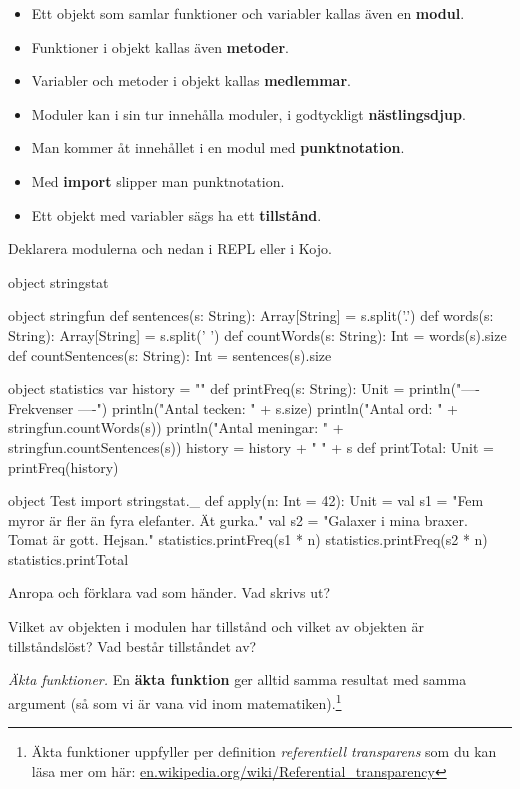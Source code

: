 \begin{itemize}[noitemsep, nolistsep]
\item Ett objekt som samlar funktioner och variabler kallas även en \textbf{modul}.
\item Funktioner i objekt kallas även \textbf{metoder}.
\item Variabler och metoder i objekt kallas \textbf{medlemmar}.
\item Moduler kan i sin tur innehålla moduler, i godtyckligt \textbf{nästlingsdjup}.
\item Man kommer åt innehållet i en modul med \textbf{punktnotation}.
\item Med \textbf{import} slipper man punktnotation.
\item Ett objekt med variabler sägs ha ett \textbf{tillstånd}.
\end{itemize}

\Subtask Deklarera modulerna  och  nedan i REPL eller i Kojo.

\begin{Code}
object stringstat {
  object stringfun {
    def sentences(s: String): Array[String] = s.split('.')
    def words(s: String): Array[String] = s.split(' ')
    def countWords(s: String): Int = words(s).size
    def countSentences(s: String): Int = sentences(s).size
  }

  object statistics {
    var history = ""
    def printFreq(s: String): Unit = {
      println("\n---- Frekvenser ----")
      println("Antal tecken:   " + s.size)
      println("Antal ord:      " + stringfun.countWords(s))
      println("Antal meningar: " + stringfun.countSentences(s))
      history = history + " " + s
    }
    def printTotal: Unit = printFreq(history)
  }
}

object Test {
  import stringstat._
  def apply(n: Int = 42): Unit = {
    val s1 = "Fem myror är fler än fyra elefanter. Ät gurka."
    val s2 = "Galaxer i mina braxer. Tomat är gott. Hejsan."
    statistics.printFreq(s1 * n)
    statistics.printFreq(s2 * n)
    statistics.printTotal
  }
}
\end{Code}

\Subtask Anropa  och förklara vad som händer. Vad skrivs ut?

\Subtask Vilket av objekten i modulen  har tillstånd och vilket av objekten är tillståndslöst? Vad består tillståndet av?


\Task \emph{Äkta funktioner.} En \textbf{äkta funktion} ger alltid samma resultat med samma argument  (så som vi är vana vid inom matematiken).\footnote{Äkta funktioner uppfyller per definition  \textit{referentiell transparens}  som du kan läsa mer om här:  \href{https://en.wikipedia.org/wiki/Referential_transparency}{en.wikipedia.org/wiki/Referential\_transparency}}

